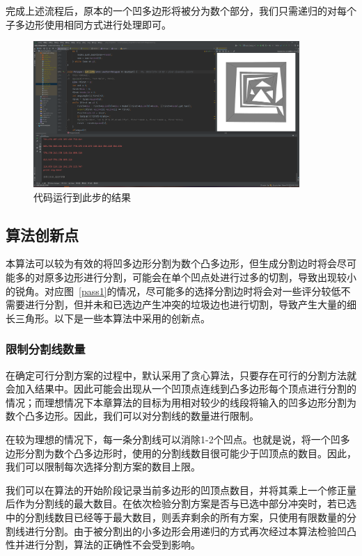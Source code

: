 完成上述流程后，原本的一个凹多边形将被分为数个部分，我们只需递归的对每个子多边形使用相同方式进行处理即可。

\begin{figure}[htp]
    \centering
    \includegraphics[width=0.9\textwidth]
    {figures/output.png}
    \caption{代码运行到此步的结果}
  \end{figure}

\subsection{算法创新点}
本算法可以较为有效的将凹多边形分割为数个凸多边形，但生成分割边时将会尽可能多的对原多边形进行分割，可能会在单个凹点处进行过多的切割，导致出现较小的锐角。对应图~\ref*{pass1}的情况，尽可能多的选择分割边时将会对一些评分较低不需要进行分割，但并未和已选边产生冲突的垃圾边也进行切割，导致产生大量的细长三角形。以下是一些本算法中采用的创新点。

\subsubsection{限制分割线数量}\label{sec:limit}
在确定可行分割方案的过程中，默认采用了贪心算法，只要存在可行的分割方法就会加入结果中。因此可能会出现从一个凹顶点连线到凸多边形每个顶点进行分割的情况；而理想情况下本章算法的目标为用相对较少的线段将输入的凹多边形分割为数个凸多边形。因此，我们可以对分割线的数量进行限制。

在较为理想的情况下，每一条分割线可以消除1-2个凹点。也就是说，将一个凹多边形分割为数个凸多边形时，使用的分割线数目很可能少于凹顶点的数目。因此，我们可以限制每次选择分割方案的数目上限。

我们可以在算法的开始阶段记录当前多边形的凹顶点数目，并将其乘上一个修正量后作为分割线的最大数目。在依次检验分割方案是否与已选中部分冲突时，若已选中的分割线数目已经等于最大数目，则丢弃剩余的所有方案，只使用有限数量的分割线进行分割。由于被分割出的小多边形会用递归的方式再次经过本算法检验凹凸性并进行分割，算法的正确性不会受到影响。

